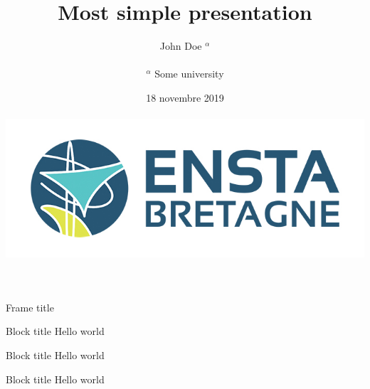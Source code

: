 \documentclass[aspectratio=169]{beamer}
\begin{document}
\title{Most simple presentation}
\author{John Doe $^{\alpha}$\\~\\
\small{$^{\alpha}$ Some university}} 
\date{18 novembre 2019\\~\\\includegraphics[width=.5\textwidth]{images/ensta-couleur}} 
\frame[plain]{\titlepage} 

\begin{frame}{Frame title}
\begin{exampleblock}{Block title}
Hello world
\end{exampleblock}
\begin{block}{Block title}
Hello world 
\end{block}
\begin{alertblock}{Block title}
Hello world \cite{Feynman1941}
\end{alertblock}
\end{frame}
\begin{frame}
\printbibliography
\end{frame}
\end{document}
